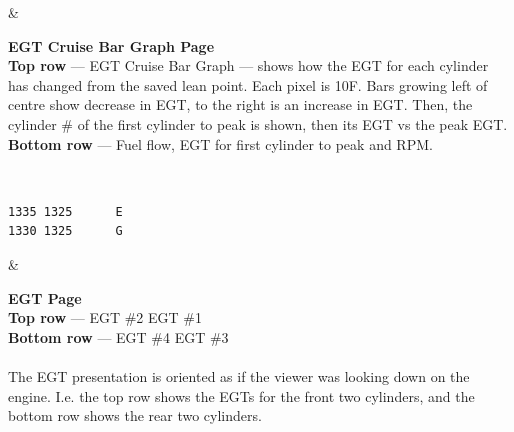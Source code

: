 \begin{longtable}
\begin{minipage}{\eistableleftcol}
\setlength{\unitlength}{1.31pt}
\end{minipage}&
\begin{minipage}{\eistablerightcol}
\vspace{\tabletopspace}
\textbf{EGT Cruise Bar Graph Page}\\
\textbf{Top row} --- EGT Cruise Bar Graph --- shows how the EGT for each cylinder has changed from the saved lean point. 
Each pixel is 10\textdegree F. Bars growing left of centre show decrease in EGT, to the right is an increase in EGT. 
Then, the cylinder \# of the first cylinder to peak is shown, then its EGT vs the peak EGT.\\
\textbf{Bottom row} --- Fuel flow, EGT for first cylinder to peak and RPM.
\vspace{\tablebottomspace}
\end{minipage}\\
\hline

\begin{minipage}{\eistableleftcol}\ttfamily 
  \begin{verbatim}1335 1325      E
1330 1325      G\end{verbatim}
\end{minipage}&
\begin{minipage}{\eistablerightcol}
\vspace{\tabletopspace}
\textbf{EGT Page }\\
\textbf{Top row} --- EGT \#2 EGT \#1\\
\textbf{Bottom row} --- EGT \#4 EGT \#3\\\\
The EGT presentation is oriented as if the viewer was looking down on the engine. I.e. the top row shows the EGTs for
the front two cylinders, and the bottom row shows the rear two cylinders.
\vspace{\tablebottomspace}
\end{minipage}\\
\hline


\end{longtable}
